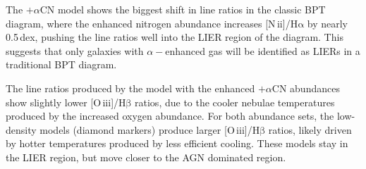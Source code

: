 \documentclass[preprint2]{aastex62}
\newcommand{\nii}{[N\,{\sc ii}]\xspace}
\newcommand{\oiii}{[O\,{\sc iii}]\xspace}
\newcommand{\ha}{\ensuremath{\mathrm{H\alpha}}\xspace}
\newcommand{\hb}{\ensuremath{\mathrm{H\beta}}\xspace}
\newcommand{\alphaCN}{\ensuremath{+\alpha\mathrm{CN}}\xspace}
\begin{document}
The \alphaCN model shows the biggest shift in line ratios in the classic BPT diagram, where the enhanced nitrogen abundance increases \nii/\ha by nearly 0.5\,dex, pushing the line ratios well into the LIER region of the diagram. This suggests that only galaxies with $\alpha-$enhanced gas will be identified as LIERs in a traditional BPT diagram.

The line ratios produced by the model with the enhanced \alphaCN abundances show slightly lower \oiii/\hb ratios, due to the cooler nebulae temperatures produced by the increased oxygen abundance. For both abundance sets, the low-density models (diamond markers) produce larger \oiii/\hb ratios, likely driven by hotter temperatures produced by less efficient cooling. These models stay in the LIER region, but move closer to the AGN dominated region.

\end{document}
